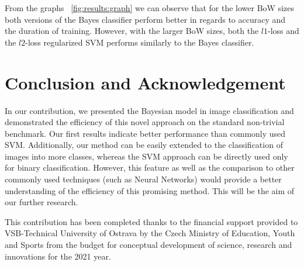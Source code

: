 \documentclass{aip-cp}
\newcommand{\figref}[1]{\figurename~\ref{#1}}
\begin{document}
From the graphs \figref{fig:results:graph} we can observe that for the lower BoW sizes both versions of the Bayes classifier perform better in regards to accuracy and the duration of training. However, with the larger BoW sizes, both the $l1$-loss and the $l2$-loss regularized SVM performs similarly to the Bayes classifier.

\section{Conclusion and Acknowledgement}
In our contribution, we presented the Bayesian model in image classification and demonstrated the efficiency of this novel approach on the standard non-trivial benchmark. Our first results indicate better performance than commonly used SVM. Additionally, our method can be easily extended to the classification of images into more classes, whereas the SVM approach can be directly used only for binary classification. However, this feature as well as the comparison to other commonly used techniques (such as Neural Networks) would provide a better understanding of the efficiency of this promising method. This will be the aim of our further research.

This contribution has been completed thanks to the financial support provided to VSB-Technical University of Ostrava by the Czech Ministry of Education, Youth and Sports from the budget for conceptual development of science, research and innovations for the 2021 year.



\end{document}
